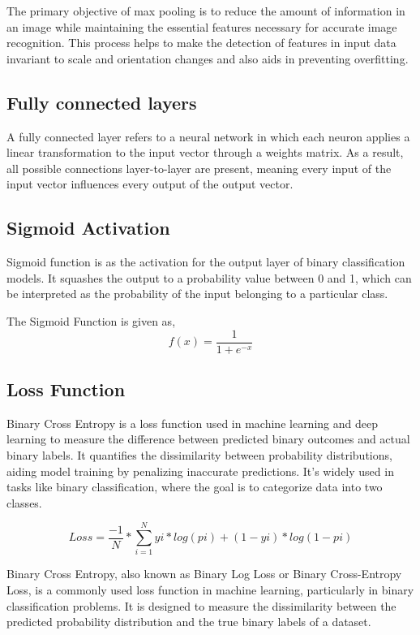 The primary objective of max pooling is to reduce the amount of information in an image while maintaining the essential features necessary for accurate image recognition. This process helps to make the detection of features in input data invariant to scale and orientation changes and also aids in preventing overfitting.

\subsection{Fully connected layers}
A fully connected layer refers to a neural network in which each neuron applies a linear transformation to the input vector through a weights matrix. As a result, all possible connections layer-to-layer are present, meaning every input of the input vector influences every output of the output vector.

\subsection{Sigmoid Activation}
Sigmoid function is as the activation for the output layer of binary classification models. It squashes the output to a probability value between 0 and 1, which can be interpreted as the probability of the input belonging to a particular class.

The Sigmoid Function is given as, \[f(x) = \frac{1} {1+e^{-x}}\]



\subsection{Loss Function}

Binary Cross Entropy is a loss function used in machine learning and deep learning to measure the difference between predicted binary outcomes and actual binary labels. It quantifies the dissimilarity between probability distributions, aiding model training by penalizing inaccurate predictions. It’s widely used in tasks like binary classification, where the goal is to categorize data into two classes.

\[ Loss = \frac{-1}{N} * \sum_{i=1}^{N} yi * log(pi) + (1-yi) * log(1-pi) \]

Binary Cross Entropy, also known as Binary Log Loss or Binary Cross-Entropy Loss, is a commonly used loss function in machine learning, particularly in binary classification problems. It is designed to measure the dissimilarity between the predicted probability distribution and the true binary labels of a dataset.

